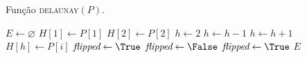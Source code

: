 \begin{algorithm}[H]
    \caption[Algoritmo \textsc{delaunay} da triangulação de delaunay]{Função \textsc{delaunay}$(P)$.}
    \label{alg:delaunay:delaunay-inicial}
    \begin{algorithmic}[1]
            \State {}
            \State $E \leftarrow \varnothing$
            \State {}
            \State $H[1] \leftarrow P[1]$
            \State $H[2] \leftarrow P[2]$
            \State $h \leftarrow 2$
                \State {}
                \State {}
                    \State $h \leftarrow h -1$
                    \State {}
                \EndWhile
                \State $h \leftarrow h + 1$
                \State $H[h] \leftarrow P[i]$
            \EndFor
            \State $\flipped \leftarrow \True$
            \While{$\flipped = \True$}
                \State $\flipped \leftarrow \False$
                        \State $\flipped \leftarrow \True$
                        \State {}
                    \EndIf
                \EndFor
            \EndWhile
            \State \Return $E$
        \EndFunction
    \end{algorithmic}
\end{algorithm}
